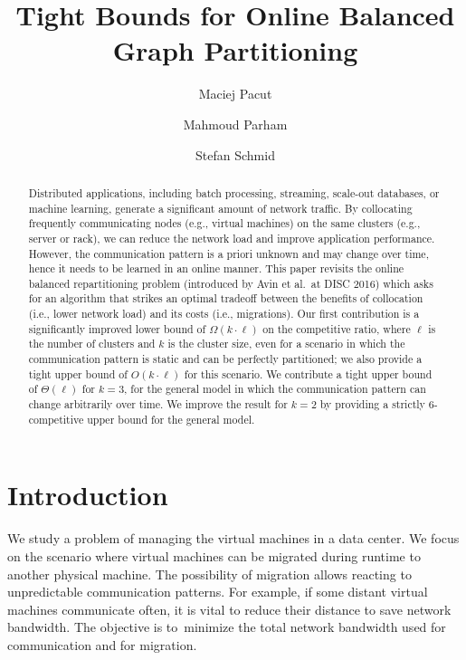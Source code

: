 \documentclass[manuscript,screen=true, review, anonymous]{acmart}
\title{Tight Bounds for Online Balanced Graph Partitioning}
\author{Maciej Pacut}
\affiliation{%
 \institution{Faculty of Computer Science, University of Vienna}
 \country{Austria}
 }
\author{Mahmoud Parham}
\affiliation{%
 \institution{Faculty of Computer Science, University of Vienna}
 \country{Austria}
 }
\author{Stefan Schmid}
\affiliation{%
 \institution{Faculty of Computer Science, University of Vienna}
 \country{Austria}
 }
\begin{document}
\begin{abstract}
	Distributed   applications,  including  batch  processing, streaming, scale-out databases,
	or machine learning, generate a significant amount of network traffic.
	By collocating frequently communicating nodes (e.g., virtual machines) on the same clusters (e.g., server or rack), we can reduce the network load and  improve application performance. 
	However, the communication pattern is a priori unknown and may change over time, hence it needs to be learned in an online manner.
	This paper revisits the online 
	balanced repartitioning problem 
	(introduced by Avin et al.~at DISC 2016)
	which asks for an algorithm that strikes
	an optimal tradeoff between the benefits
	of collocation (i.e., lower network load) 
	and its costs (i.e., migrations). 
	Our first contribution is a significantly improved
	lower bound of $\Omega(k\cdot \ell)$ on the
	competitive ratio, where $\ell$ is the number
	of clusters and $k$ is the cluster size,
	even for a scenario in which the communication
	pattern is static and can be perfectly partitioned;
	we also provide a tight upper bound 
	of $O(k\cdot \ell)$ for this scenario.
	We contribute a tight upper bound
	of $\Theta(\ell)$ for $k=3$,
	for the general model in which the
	communication pattern can change arbitrarily
	over time.
	We improve the result for $k=2$ by providing a strictly $6$-competitive upper bound for the general model.
	
\end{abstract}

\maketitle

\renewcommand{\shortauthors}{M.~Pacut, M.~Parham, S.~Schmid}


\section{Introduction}

We study a problem of managing the virtual machines in a data center.
We focus on the scenario where virtual machines can be migrated during runtime to another physical machine.
The possibility of migration allows reacting to unpredictable communication patterns.
For example, if some distant virtual machines communicate often, it is vital to reduce their distance to save network bandwidth.
The objective is to~minimize the total network bandwidth used for communication and for migration.
\end{document}
